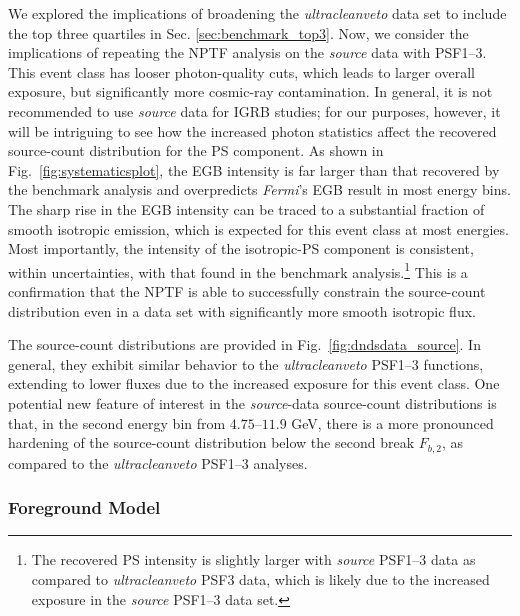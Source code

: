 We explored the implications of broadening the {\it ultracleanveto} data set to include the top three quartiles in Sec. \ref{sec:benchmark_top3}.   Now, we consider the implications of repeating the NPTF analysis on the {\it source} data with PSF1--3.  This event class has looser photon-quality cuts, which leads to larger overall exposure, but significantly more cosmic-ray contamination.  In general, it is not recommended to use {\it source} data for IGRB studies; for our purposes, however, it will be intriguing to see how the increased photon statistics affect the recovered source-count distribution for the PS component.  As shown in Fig.~\ref{fig:systematicsplot}, the EGB intensity is far larger than that recovered by the benchmark analysis and overpredicts \emph{Fermi}'s EGB result in most energy bins.  The sharp rise in the EGB intensity can be traced to a substantial fraction of smooth isotropic emission, which is expected for this event class at most energies.  Most importantly, the intensity of the isotropic-PS component is consistent, within uncertainties, with that found in the benchmark analysis.\footnote{The recovered PS intensity is slightly larger with {\it source} PSF1--3 data as compared to {\it ultracleanveto} PSF3 data, which is likely due to the increased exposure in the {\it source} PSF1--3 data set. 
}   This is a  confirmation that the NPTF is able to successfully constrain the source-count distribution even in a data set with significantly more smooth isotropic flux.  

The source-count distributions are provided in Fig.~\ref{fig:dndsdata_source}.  In general, they exhibit similar behavior to the {\it ultracleanveto} PSF1--3 functions, extending to lower fluxes due to the increased exposure for this event class.  One potential new feature of interest in the {\it source}-data source-count distributions is that, in the second energy bin from $4.75$--$11.9$ GeV, there is a more pronounced hardening of the source-count distribution below the second break $F_{b,2}$, as compared to the {\it ultracleanveto} PSF1--3 analyses.

\subsubsection{Foreground Model}
\label{sec:foreground}

